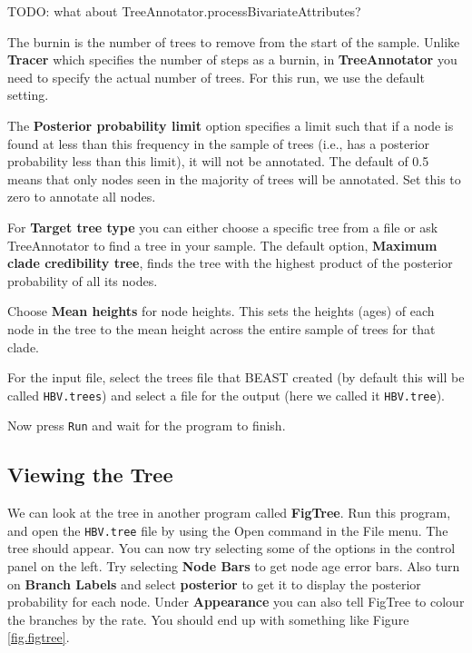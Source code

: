 \documentclass{article}
\begin{document}
{\color{red}TODO: what about  TreeAnnotator.processBivariateAttributes?}

The burnin is the number of trees to remove from the start of the sample. Unlike {\bf Tracer} which specifies the number of steps as a burnin, in {\bf TreeAnnotator} you need to specify the actual number of trees. For this run, we use the default setting.

The {\bf Posterior probability limit} option specifies a limit such that if a node is found at less than this frequency in the sample of trees (i.e., has a posterior probability less than this limit), it will not be annotated. The default of 0.5 means that only nodes seen in the majority of trees will be annotated. Set this to zero to annotate all nodes.

For {\bf Target tree type} you can either choose a specific tree from a file or ask TreeAnnotator to find a tree in your sample. The default option, {\bf Maximum clade credibility tree}, finds the tree with the highest product of the posterior probability of all its nodes.

Choose {\bf Mean heights} for node heights. This sets the heights (ages) of each node in the tree to the mean height across the entire sample of trees for that clade.

For the input file, select the trees file that BEAST created (by default this will be called \texttt{HBV.trees}) and select a file for the output (here we called it \texttt{HBV.tree}).

Now press \texttt{Run} and wait for the program to finish.

\subsection*{Viewing the Tree}

We can look at the tree in another program called {\bf FigTree}. Run this program, and open
the \texttt{HBV.tree} file by using the Open command in the File menu. The tree should appear.
You can now try selecting some of the options in the control panel on the left. Try selecting
{\bf Node Bars} to get node age error bars. Also turn on {\bf Branch Labels} and select {\bf posterior} to get
it to display the posterior probability for each node. Under {\bf Appearance} you can also tell FigTree
to colour the branches by the rate.
You should end up with something like Figure \ref{fig.figtree}.
\end{document}
